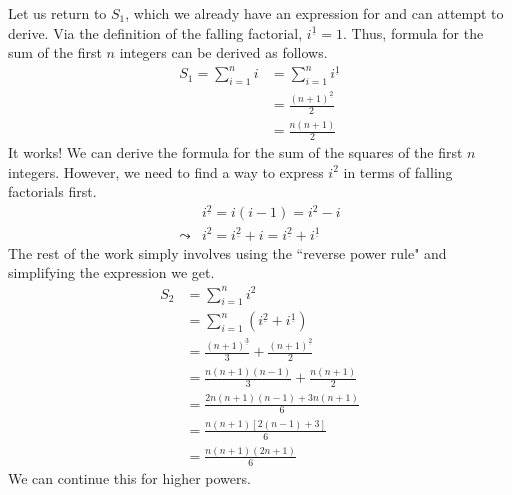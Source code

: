 \documentclass[a4paper]{article}
\theoremstyle{definition}
\begin{document}
Let us return to $S_1$, which we already have an expression for and can attempt to derive.
Via the definition of the falling factorial, $i^{\underline{1}}=1$.
Thus, formula for the sum of the first $n$ integers can be derived as follows.
\begin{align*}
    S_1 = \sum_{i=1}^{n} i & = \sum_{i=1}^{n} i^{\underline{1}} \\
                           & = \frac{(n+1)^{\underline{2}}}{2}  \\
                           & = \frac{n(n+1)}{2}
\end{align*}
It works!
We can derive the formula for the sum of the squares of the first $n$ integers.
However, we need to find a way to express $i^2$ in terms of falling factorials first.
\begin{align*}
             & i^{\underline{2}} = i(i-1) = i^2 - i                                \\
    \leadsto & i^2 = i^{\underline{2}} + i = i^{\underline{2}} + i^{\underline{1}}
\end{align*}
The rest of the work simply involves using the ``reverse power rule" and simplifying the expression we get.
\begin{align*}
    S_2 & = \sum_{i=1}^{n} i^2                                                  \\
        & = \sum_{i=1}^{n} \left( i^{\underline{2}} + i^{\underline{1}} \right) \\
        & = \frac{(n+1)^{\underline{3}}}{3} + \frac{(n+1)^{\underline{2}}}{2}   \\
        & = \frac{n(n+1)(n-1)}{3} + \frac{n(n+1)}{2}                            \\
        & = \frac{2n(n+1)(n-1) + 3n(n+1)}{6}                                    \\
        & = \frac{n(n+1)[2(n-1) + 3]}{6}                                        \\
        & = \frac{n(n+1)(2n+1)}{6}
\end{align*}
We can continue this for higher powers.
\end{document}
